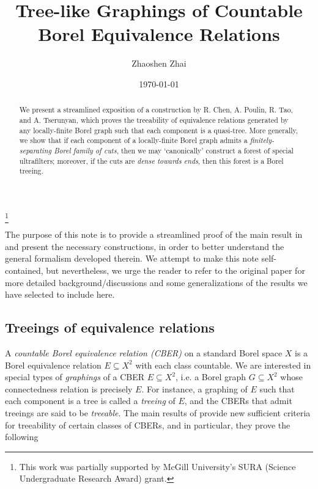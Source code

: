 \documentclass[reqno]{amsart}
\begin{document}
    \title{Tree-like Graphings of Countable Borel Equivalence Relations}
    \author{Zhaoshen Zhai}
    \address{Department of Mathematics and Statistics, McGill University, 805 Sherbrooke Street West, Montreal, QC, H3A 0B9, Canada}
    \thanks{This work was partially supported by McGill University's SURA (Science Undergraduate Research Award) grant.}
    \date{\today}

    \begin{abstract}
        We present a streamlined exposition of a construction by R. Chen, A. Poulin, R. Tao, and A. Tserunyan, which proves the treeability of equivalence relations generated by any locally-finite Borel graph such that each component is a quasi-tree. More generally, we show that if each component of a locally-finite Borel graph admits a \textit{finitely-separating Borel family of cuts}, then we may `canonically' construct a forest of special ultrafilters; moreover, if the cuts are \textit{dense towards ends}, then this forest is a Borel treeing.
    \end{abstract}

    \maketitle

    The purpose of this note is to provide a streamlined proof of the main result in \cite{CPTT23} and present the necessary constructions, in order to better understand the general formalism developed therein. We attempt to make this note self-contained, but nevertheless, we urge the reader to refer to the original paper for more detailed background/discussions and some generalizations of the results we have selected to include here.

    \subsection*{Treeings of equivalence relations}

    A \textit{countable Borel equivalence relation (CBER)} on a standard Borel space $X$ is a Borel equivalence relation $E\subseteq X^2$ with each class countable. We are interested in special types of \textit{graphings} of a CBER $E\subseteq X^2$, i.e. a Borel graph $G\subseteq X^2$ whose connectedness relation is precisely $E$. For instance, a graphing of $E$ such that each component is a tree is called a \textit{treeing} of $E$, and the CBERs that admit treeings are said to be \textit{treeable}. The main results of \cite{CPTT23} provide new sufficient criteria for treeability of certain classes of CBERs, and in particular, they prove the following
\end{document}
